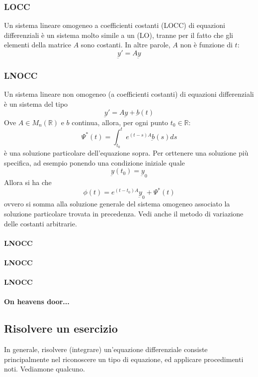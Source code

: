 \documentclass[a4paper,12pt]{article}
\begin{document}
\subsubsection{LOCC}
Un sistema lineare omogeneo a coefficienti costanti (LOCC) di equazioni differenziali è un sistema molto simile a un (LO), tranne per il fatto che gli elementi della matrice $A$ sono costanti. In altre parole, $A$ non è funzione di $t$:
$$\underbar{y}' = A\underbar{y}$$

\subsubsection{LNOCC}
Un sistema lineare non omogeneo (a coefficienti costanti) di equazioni differenziali è un sistema del tipo
$$\underbar{y}'=A\underbar{y}+\underbar{b}(t)$$
Ove $A\in M_n(\mathbb{R})$ e $b$ continua, allora, per ogni punto $t_0 \in \mathbb{R}$:
$$\Psi^*(t)= \int_{t_0}^t e^{(t-s)A} \underbar{b}(s)ds$$
è una soluzione particolare dell'equazione sopra.
Per orttenere una soluzione più specifica, ad esempio ponendo una condizione iniziale quale
$$\underbar{y}(t_0)=\underbar{y}_0$$
Allora si ha che
$$\phi(t)=e^{(t-t_0)A}\underbar{y}_0+\Psi^*(t)$$
ovvero si somma alla soluzione generale del sistema omogeneo associato la soluzione particolare trovata in precedenza.
Vedi anche il metodo di variazione delle costanti arbitrarie.

\paragraph{LNOCC}
\paragraph{LNOCC}
\paragraph{LNOCC}
\paragraph{On heavens door...}
\subsection{Risolvere un esercizio}
In generale, risolvere (integrare) un'equazione differenziale consiste principalmente nel riconoscere un tipo di equazione, ed applicare procedimenti noti. Vediamone qualcuno.
\end{document}
